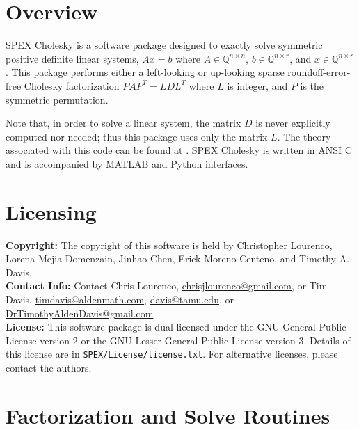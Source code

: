\documentclass[12pt,oneside]{book}
\theoremstyle{definition}
\begin{document}
\section{Overview} \label{s:Chol:intro}
SPEX Cholesky is a software package designed to exactly solve symmetric positive definite
linear systems, $A x = b$ where $A \in \mathbb{Q}^{n \times
n}$, $b \in \mathbb{Q}^{n \times r}$, and $x \in \mathbb{Q}^{n \times
r}$. This package performs either a left-looking or up-looking sparse
roundoff-error-free Cholesky factorization $P A P^T =  L D L^T$ where $L$ is integer,
and $P$ is the symmetric permutation.

Note that, in order to solve a linear system, the matrix $D$ is never explicitly computed nor needed; thus this package uses only the matrix $L$. The theory associated with this code can be found at
 \cite{lourenco2022exactly}. SPEX Cholesky is written in ANSI C and is accompanied by MATLAB and Python interfaces.

 
\section{Licensing} \label{s:Chol:licensing}
\textbf{Copyright:} The copyright of this software is held by  Christopher Lourenco, Lorena Mejia Domenzain, Jinhao Chen, Erick Moreno-Centeno, and Timothy A. Davis.\\

\noindent \textbf{Contact Info:} Contact Chris Lourenco,
\href{mailto:chrisjlourenco@gmail.com}{chrisjlourenco@gmail.com}, or Tim Davis,
\href{mailto:timdavis@aldenmath.com}{timdavis@aldenmath.com},
\href{mailto:davis@tamu.edu}{davis@tamu.edu}, or
\href{DrTimothyAldenDavis@gmail.com}{DrTimothyAldenDavis@gmail.com}\\

\noindent \textbf{License:} This software package is dual licensed under the GNU General Public License version 2 or the GNU Lesser General Public License version 3. Details of this license are in \verb|SPEX/License/license.txt|. For alternative licenses, please contact the authors.

\section{Factorization and Solve Routines}
\end{document}
